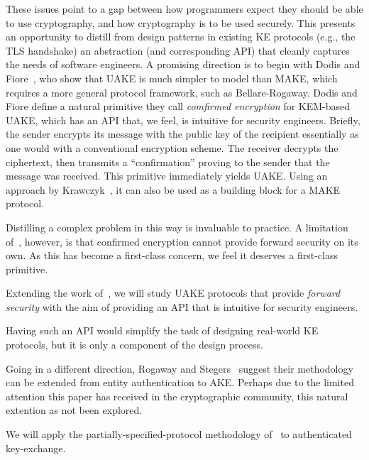 These issues point to a gap between how programmers expect they should be able
to use cryptography, and how cryptography is to be used securely. This presents
an opportunity to distill from design patterns in existing KE protocols (e.g.,
the TLS handshake) an abstraction (and corresponding API) that cleanly captures
the needs of software engineers.
%
A promising direction is to begin with Dodis and
Fiore~\cite{dodis2017unilateral}, who show that UAKE is much simpler to model
than MAKE, which requires a more general protocol framework, such as
Bellare-Rogaway.
%
Dodis and Fiore define a natural primitive they call
\emph{comfirmed encryption} for KEM-based UAKE, which has an API that, we
feel, is intuitive for security engineers. Briefly, the sender encrypts its
message with the public key of the recipient essentially as one would with a
conventional encryption scheme. The receiver decrypts the ciphertext, then
transmits a ``confirmation'' proving to the sender that the message was
received.
%
This primitive immediately yields UAKE. Using an approach by
Krawczyk~\cite{krawczyk2016unilateral-to-mutual}, it can also be used as a
building block for a MAKE protocol.

Distilling a complex problem in this way is invaluable to practice. A
limitation of~\cite{dodis2017unilateral}, however, is that confirmed encryption
cannot provide forward security on its own. As this has become a first-class
concern, we feel it deserves a first-class primitive.
%

\begin{task}
  Extending the work of~\cite{dodis2017unilateral}, we will study UAKE protocols
  that provide \emph{forward security} with the aim of providing an API that is
  intuitive for security engineers.
\end{task}

\noindent
Having such an API would simplify the task of designing real-world KE
protocols, but it is only a component of the design process.

Going in a different direction, Rogaway and Stegers~\cite{RS09} suggest their
methodology can be extended from entity authentication to AKE.
Perhaps due to the limited attention this paper has received in the
cryptographic community, this natural extention as not been explored.
\begin{task}
  We will apply the partially-specified-protocol methodology of~\cite{RS09} to
  authenticated key-exchange.
\end{task}


